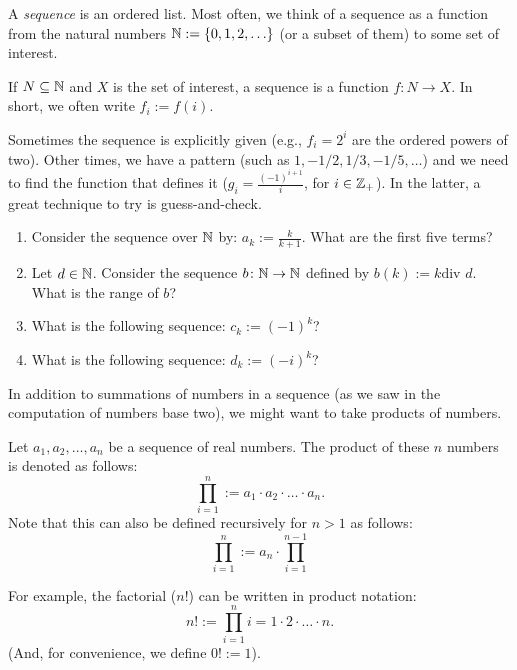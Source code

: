 \begin{definition}[Sequence]
    A \emph{sequence} is an ordered list.  Most often, we think of a sequence as
    a function from the natural numbers ${\mathbb N}:=\{ 0,1,2, \ldots\}$ (or a subset of
    them) to some set of interest.

    If $N \subseteq {\mathbb N}$ and $X$ is the set of interest, a sequence is a
    function $f \colon N \to X$.  In short, we often write $f_i:=f(i)$.
\end{definition}

Sometimes the sequence is explicitly given (e.g., $f_i=2^i$ are the ordered
powers of two).  Other times, we have a pattern (such as $1,-1/2, 1/3, -1/5,
\ldots$) and we need to find the function that defines it ($g_i=\frac{(-1)^{i+1}}{i}$, for
$i\in {\mathbb Z}_+$).  In the latter, a great technique to try is guess-and-check.

\pagebreak


\begin{enumerate}
    \item Consider the sequence over ${\mathbb N}$ by: $a_k :=\frac{k}{k+1}$.
        What are the first five terms?
        \practice
    \item Let $d \in {\mathbb N}$.  Consider the sequence $b \colon {\mathbb N} \to {\mathbb N}$ defined
        by $b(k):= k \text {div } d$.  What is the range of $b$?
        \practice
    \item What is the following sequence: $c_k := (-1)^{k}$?
        \practice
    \item What is the following sequence: $d_k := (-i)^{k}$?
        \practice
\end{enumerate}

In addition to summations of numbers in a sequence (as we saw in the computation
of numbers base two),
we might want to take products of numbers.

\begin{definition}
    Let $a_1, a_2, \ldots, a_n$ be a sequence of real numbers.
    The product of these $n$ numbers is denoted as follows:
    $$
        \prod_{i=1}^n:= a_1\cdot a_2 \cdot \ldots \cdot a_n.
    $$
    Note that this can also be defined recursively for $n > 1$ as follows:
    $$
        \prod_{i=1}^n := a_n \cdot \prod_{i=1}^{n-1}
    $$
\end{definition}

For example, the factorial ($n!$) can be written in product notation:
$$
    n! := \prod_{i=1}^n i = 1 \cdot 2 \cdot \ldots \cdot n.
$$
(And, for convenience, we define $0!:=1$).

